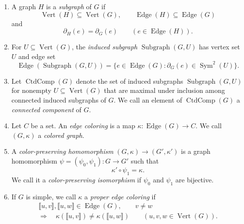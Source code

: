 \begin{definition}
\begin{enumerate}[font=\itshape]
\[\begin{aligned}
 &\quad+2\#\{e\in\operatorname{Edge}(G):\partial_G(e)=\llbracket v,v\rrbracket\}.
\end{aligned}
\]
We define the set of \textit{leaves} by
\[
 \operatorname{Leaf}(G)=\{v\in\operatorname{Vert}(G):\deg_G(v)=1\}.
\]
\item\label{d:graph-subgraph} A graph $H$ is a \textit{subgraph} of $G$ if
\[
 \operatorname{Vert}(H)\subseteq\operatorname{Vert}(G),\qquad
 \operatorname{Edge}(H)\subseteq\operatorname{Edge}(G)
\]
and
\[
 \partial_H(e)=\partial_G(e)\qquad(e\in\operatorname{Edge}(H)).
\]
\item\label{d:graph-induced-subgraph} For $U\subseteq\operatorname{Vert}(G)$, the \textit{induced subgraph} $\operatorname{Subgraph}(G,U)$
has vertex set $U$ and edge set
\[
 \operatorname{Edge}(\operatorname{Subgraph}(G,U))
 =\{e\in\operatorname{Edge}(G):\partial_G(e)\in\operatorname{Sym}^{2}(U)\}.
\]
\item\label{d:graph-connected-components} Let $\operatorname{CtdComp}(G)$ denote the set of induced subgraphs
$\operatorname{Subgraph}(G,U)$ for nonempty $U\subseteq\operatorname{Vert}(G)$
that are maximal under inclusion among connected induced subgraphs of $G$.
We call an element of $\operatorname{CtdComp}(G)$ a \textit{connected component} of $G$.
\item\label{d:graph-edge-coloring} Let $C$ be a set.
An \textit{edge coloring} is a map $\kappa:\operatorname{Edge}(G)\to C$.
We call $(G,\kappa)$ a \textit{colored graph}.
\item A \textit{color-preserving homomorphism}
$(G,\kappa)\to(G',\kappa')$ is a graph homomorphism $\psi=(\psi_0,\psi_1):G\to G'$ such that
\[
 \kappa'\circ\psi_1=\kappa.
\]
We call it a \textit{color-preserving isomorphism} if $\psi_0$ and $\psi_1$ are bijective.
\item If $G$ is simple, we call $\kappa$ a \textit{proper edge coloring} if
\[
\begin{gathered}
 \llbracket u,v\rrbracket,\llbracket u,w\rrbracket\in\operatorname{Edge}(G),\qquad v\ne w\\
 \Longrightarrow\quad
 \kappa(\llbracket u,v\rrbracket)\ne\kappa(\llbracket u,w\rrbracket)\qquad(u,v,w\in\operatorname{Vert}(G)).
\end{gathered}
\]
\end{enumerate}
\end{definition}


